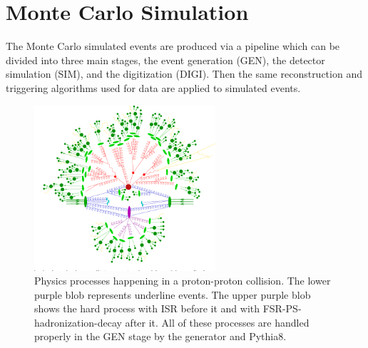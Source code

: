
\section{Monte Carlo Simulation}
\label{sec:cmsexperiment:simulation}



The Monte Carlo simulated events are produced via a pipeline which can be divided into three main stages, the event generation (GEN), the detector simulation (SIM), and the digitization (DIGI). Then the same reconstruction and triggering algorithms used for data are applied to simulated events.


\begin{figure}[ht]
    \centering
    \includegraphics[trim={0 0.1cm 0 0}, clip, width=0.6\textwidth]{chapters/CMSExperiment/sectionMCSimulation/figures/ps.png}
    \caption{Physics processes happening in a proton-proton collision. The lower purple blob represents underline events. The upper purple blob shows the hard process with ISR before it and with FSR-PS-hadronization-decay after it. All of these processes are handled properly in the GEN stage by the generator and Pythia8. }
    \label{fig:cmsexperiment:simulation:collision}
\end{figure}


